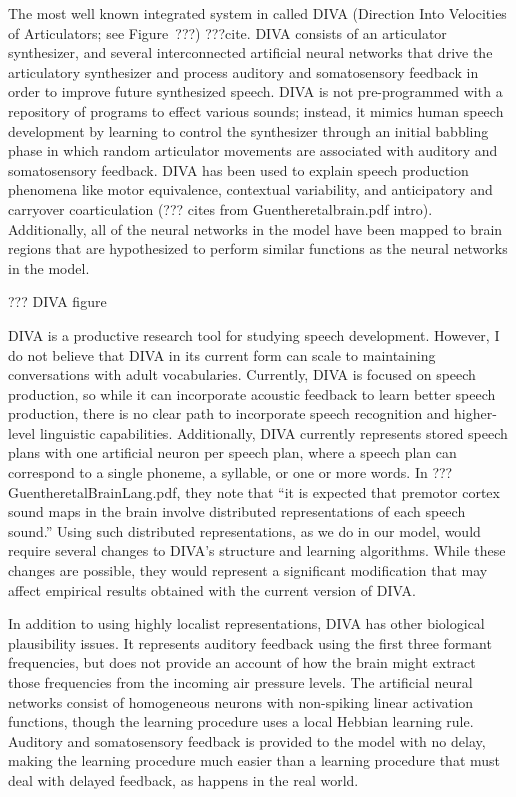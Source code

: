 The most well known integrated system
in called DIVA
(Direction Into Velocities of Articulators;
see Figure~???) ???cite.
DIVA consists of an articulator synthesizer,
and several interconnected artificial neural networks
that drive the articulatory synthesizer
and process auditory and somatosensory feedback
in order to improve future synthesized speech.
DIVA is not pre-programmed with a repository
of programs to effect various sounds;
instead, it mimics human speech development
by learning to control the synthesizer
through an initial babbling phase
in which random articulator movements
are associated with auditory
and somatosensory feedback.
DIVA has been used to explain
speech production phenomena
like motor equivalence, contextual variability,
and anticipatory and carryover coarticulation
(??? cites from Guentheretalbrain.pdf intro).
Additionally, all of the neural networks
in the model have been mapped
to brain regions that are hypothesized
to perform similar functions
as the neural networks in the model.

??? DIVA figure

DIVA is a productive research tool
for studying speech development.
However, I do not believe that DIVA
in its current form
can scale to maintaining conversations
with adult vocabularies.
Currently, DIVA is focused on speech production,
so while it can incorporate acoustic feedback
to learn better speech production,
there is no clear path
to incorporate speech recognition
and higher-level linguistic capabilities.
Additionally, DIVA currently represents
stored speech plans with one artificial
neuron per speech plan,
where a speech plan can correspond to
a single phoneme, a syllable, or one or more words.
In ??? GuentheretalBrainLang.pdf,
they note that ``it is expected that
premotor cortex sound maps in the brain
involve distributed representations
of each speech sound.''
Using such distributed representations,
as we do in our model,
would require several changes to DIVA's
structure and learning algorithms.
While these changes are possible,
they would represent a significant
modification that may affect
empirical results obtained
with the current version of DIVA.

In addition to using highly localist representations,
DIVA has other biological plausibility issues.
It represents auditory feedback using the first
three formant frequencies,
but does not provide an account of
how the brain might extract those
frequencies from the incoming air pressure levels.
The artificial neural networks
consist of homogeneous neurons
with non-spiking linear activation functions,
though the learning procedure
uses a local Hebbian learning rule.
Auditory and somatosensory feedback
is provided to the model with no delay,
making the learning procedure
much easier than a learning procedure
that must deal with delayed feedback,
as happens in the real world.

